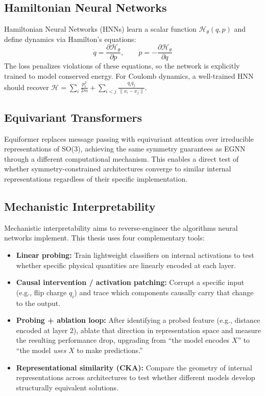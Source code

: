 \documentclass[12pt]{article}
\begin{document}
\subsection{Hamiltonian Neural Networks}

Hamiltonian Neural Networks (HNNs) \cite{greydanus2019hamiltonian} learn a
scalar function $\mathcal{H}_\theta(q, p)$ and define dynamics via Hamilton's
equations: \[ \dot{q} = \frac{\partial \mathcal{H}_\theta}{\partial p}, \qquad
\dot{p} = -\frac{\partial \mathcal{H}_\theta}{\partial q} \] The loss penalizes
violations of these equations, so the network is explicitly trained to model
conserved energy. For Coulomb dynamics, a well-trained HNN should recover
$\mathcal{H} = \sum_i \frac{p_i^2}{2m} + \sum_{i < j} \frac{q_i q_j}{\|x_i -
x_j\|}$.

\subsection{Equivariant Transformers}

Equiformer \cite{liao2022equiformer} replaces message passing with equivariant
attention over irreducible representations of SO(3), achieving the same symmetry
guarantees as EGNN through a different computational mechanism. This enables a
direct test of whether symmetry-constrained architectures converge to similar
internal representations regardless of their specific implementation.

\subsection{Mechanistic Interpretability}

Mechanistic interpretability \cite{olah2020zoom, nanda2023progress} aims to
reverse-engineer the algorithms neural networks implement. This thesis uses four
complementary tools: \begin{itemize} \item \textbf{Linear probing:} Train
  lightweight classifiers on internal activations to test whether specific
  physical quantities are linearly encoded at each layer. \item \textbf{Causal
  intervention / activation patching:} Corrupt a specific input (e.g., flip
  charge $q_i$) and trace which components causally carry that change to the
  output. \item \textbf{Probing + ablation loop:} After identifying a probed
  feature (e.g., distance encoded at layer 2), ablate that direction in
  representation space and measure the resulting performance drop, upgrading
  from ``the model encodes $X$'' to ``the model \textit{uses} $X$ to make
  predictions.'' \item \textbf{Representational similarity (CKA):} Compare the
  geometry of internal representations across architectures to test whether
different models develop structurally equivalent solutions. \end{itemize}
\end{document}
